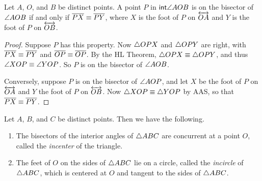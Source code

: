 \begin{prop}
Let \(A\), \(O\), and \(B\) be distinct points.
A point \(P\) in \(\mathsf{int}\angle{AOB}\) is on the bisector of \(\angle{AOB}\) if and only if \(\overline{PX} \equiv \overline{PY}\), where \(X\) is the foot of \(P\) on \(\overleftrightarrow{OA}\) and \(Y\) is the foot of \(P\) on \(\overleftrightarrow{OB}\).
\end{prop}

\begin{proof}
Suppose \(P\) has this property.
Now \(\bigtriangleup{OPX}\) and \(\bigtriangleup{OPY}\) are right, with \(\overline{PX} \equiv \overline{PY}\) and \(\overline{OP} \equiv \overline{OP}\).
By the HL Theorem, \(\bigtriangleup{OPX} \equiv \bigtriangleup{OPY}\), and thus \(\angle{XOP} \equiv \angle{YOP}\).
So \(P\) is on the bisector of \(\angle{AOB}\).

Conversely, suppose \(P\) is on the bisector of \(\angle{AOP}\), and let \(X\) be the foot of \(P\) on \(\overleftrightarrow{OA}\) and \(Y\) the foot of \(P\) on \(\overleftrightarrow{OB}\).
Now \(\bigtriangleup{XOP} \equiv \bigtriangleup{YOP}\) by AAS, so that \(\overline{PX} \equiv \overline{PY}\).
\end{proof}

\begin{construct}
Let \(A\), \(B\), and \(C\) be distinct points.
Then we have the following.
\begin{enumerate}
\item The bisectors of the interior angles of \(\bigtriangleup{ABC}\) are concurrent at a point \(O\), called the \emph{incenter} of the triangle.

\item The feet of \(O\) on the sides of \(\bigtriangleup{ABC}\) lie on a circle, called the \emph{incircle} of \(\bigtriangleup{ABC}\), which is centered at \(O\) and tangent to the sides of \(\bigtriangleup{ABC}\).
\end{enumerate}
\end{construct}

